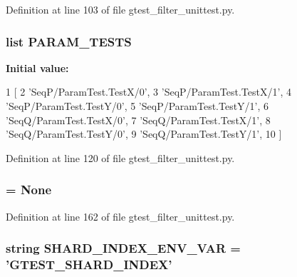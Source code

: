\-Definition at line 103 of file gtest\-\_\-filter\-\_\-unittest.\-py.

\hypertarget{namespacegtest__filter__unittest_a32e8a5c72ae50f55ab9fb6ef2037638c}{
\subsubsection[{\-P\-A\-R\-A\-M\-\_\-\-T\-E\-S\-T\-S}]{\setlength{\rightskip}{0pt plus 5cm}list {\bf \-P\-A\-R\-A\-M\-\_\-\-T\-E\-S\-T\-S}}}\label{d5/dea/namespacegtest__filter__unittest_a32e8a5c72ae50f55ab9fb6ef2037638c}
{\bfseries \-Initial value\-:}
\begin{DoxyCode}
1 [
2     'SeqP/ParamTest.TestX/0',
3     'SeqP/ParamTest.TestX/1',
4     'SeqP/ParamTest.TestY/0',
5     'SeqP/ParamTest.TestY/1',
6     'SeqQ/ParamTest.TestX/0',
7     'SeqQ/ParamTest.TestX/1',
8     'SeqQ/ParamTest.TestY/0',
9     'SeqQ/ParamTest.TestY/1',
10     ]
\end{DoxyCode}


\-Definition at line 120 of file gtest\-\_\-filter\-\_\-unittest.\-py.

\hypertarget{namespacegtest__filter__unittest_a1d6ab553380c1113d7ea8bcfd6b273b4}{
\subsubsection[{param\-\_\-tests\-\_\-present}]{ = \-None}}\label{d5/dea/namespacegtest__filter__unittest_a1d6ab553380c1113d7ea8bcfd6b273b4}


\-Definition at line 162 of file gtest\-\_\-filter\-\_\-unittest.\-py.

\hypertarget{namespacegtest__filter__unittest_a8eb464868f4a78b232279d364ad58b55}{
\subsubsection[{\-S\-H\-A\-R\-D\-\_\-\-I\-N\-D\-E\-X\-\_\-\-E\-N\-V\-\_\-\-V\-A\-R}]{\setlength{\rightskip}{0pt plus 5cm}string {\bf \-S\-H\-A\-R\-D\-\_\-\-I\-N\-D\-E\-X\-\_\-\-E\-N\-V\-\_\-\-V\-A\-R} = '\-G\-T\-E\-S\-T\-\_\-\-S\-H\-A\-R\-D\-\_\-\-I\-N\-D\-E\-X'}}\label{d5/dea/namespacegtest__filter__unittest_a8eb464868f4a78b232279d364ad58b55}



